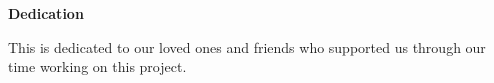 
\begin{center}\textbf{Dedication}\end{center}

This is dedicated to our loved ones and friends who supported us through our time working on this project.

\cleardoublepage


